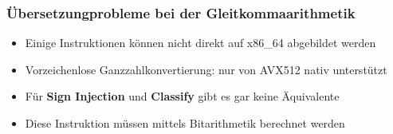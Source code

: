\begin{frame}
    \frametitle{Übersetzungprobleme bei der Gleitkommaarithmetik}
    \begin{itemize}
        \item Einige Instruktionen können nicht direkt auf x86\_64 abgebildet werden
        \item Vorzeichenlose Ganzzahlkonvertierung: nur von AVX512 nativ unterstützt
        \item Für \textbf{Sign Injection} und \textbf{Classify} gibt es gar keine Äquivalente
        \item Diese Instruktion müssen mittels Bitarithmetik berechnet werden
    \end{itemize}
\end{frame}

\clearpage


